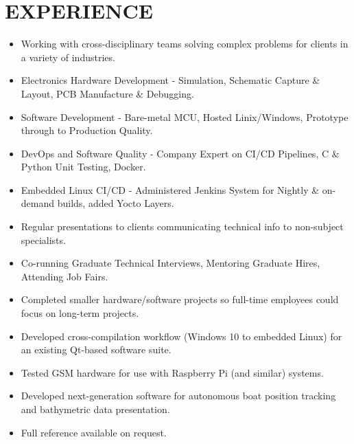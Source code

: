 \section{EXPERIENCE}
{
  {\begin{itemize}
      \item Working with cross-disciplinary teams solving complex problems for clients in a variety of industries. 
      \item Electronics Hardware Development - Simulation, Schematic Capture \& Layout, PCB Manufacture \& Debugging.
      \item Software Development - Bare-metal MCU, Hosted Linix/Windows, Prototype through to Production Quality. 
      \item DevOps and Software Quality - Company Expert on CI/CD Pipelines, C \& Python Unit Testing, Docker.
      \item Embedded Linux CI/CD - Administered Jenkins System for Nightly \& on-demand builds, added Yocto Layers.
      \item Regular presentations to clients communicating technical info to non-subject specialists.
      \item Co-running Graduate Technical Interviews, Mentoring Graduate Hires, Attending Job Fairs. 
  \end{itemize}
  }
}
  
{
  {\begin{itemize}
      \item Completed smaller hardware/software projects so full-time employees could focus on long-term projects.
      \item Developed cross-compilation workflow (Windows 10 to embedded Linux) for an existing Qt-based software suite.
      \item Tested GSM hardware for use with Raspberry Pi (and similar) systems.   
      \item Developed next-generation software for autonomous boat position tracking and bathymetric data presentation.
      \item Full reference available on request.
  \end{itemize}
  }
}


